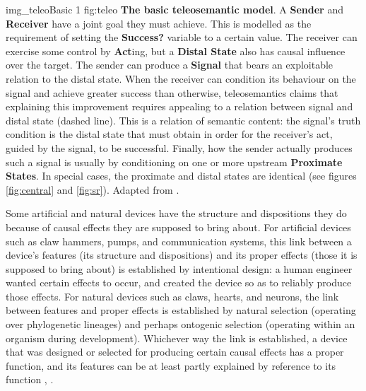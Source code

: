 \documentclass[12pt]{article}
\begin{document}
\begin{myfig}
    {img_teleoBasic} %
    {1} %
    {fig:teleo} %
    {\textbf{The basic teleosemantic model}. 
    A \textbf{Sender} and \textbf{Receiver} have a joint goal they must achieve. 
    This is modelled as the requirement of setting the \textbf{Success?} variable to a certain value. 
    The receiver can exercise some control by \textbf{Act}ing, but a \textbf{Distal State} also has causal influence over the target. 
    The sender can produce a \textbf{Signal} that bears an exploitable relation to the distal state.
    When the receiver can condition its behaviour on the signal and achieve greater success than otherwise, teleosemantics claims that explaining this improvement requires appealing to a relation between signal and distal state (dashed line).
    This is a relation of semantic content: the signal's truth condition is the distal state that must obtain in order for the receiver's act, guided by the signal, to be successful.
    Finally, how the sender actually produces such a signal is usually by conditioning on one or more upstream \textbf{Proximate States}.
    In special cases, the proximate and distal states are identical (see figures \ref{fig:central} and \ref{fig:sr}).
    Adapted from \citet[fig. 6.3, p. 78]{millikan2004varieties}.
    } %
\end{myfig}

Some artificial and natural devices have the structure and dispositions they do because of causal effects they are supposed to bring about.
For artificial devices such as claw hammers, pumps, and communication systems, this link between a device's features (its structure and dispositions) and its proper effects (those it is supposed to bring about) is established by intentional design: a human engineer wanted certain effects to occur, and created the device so as to reliably produce those effects.
For natural devices such as claws, hearts, and neurons, the link between features and proper effects is established by natural selection (operating over phylogenetic lineages) and perhaps ontogenic selection (operating within an organism during development).
Whichever way the link is established, a device that was designed or selected for producing certain causal effects has a proper function, and its features can be at least partly explained by reference to its function \citep[$\S\S$1-2]{millikan1984language}, \citep[$\S$2]{millikan1993white}.
\end{document}

